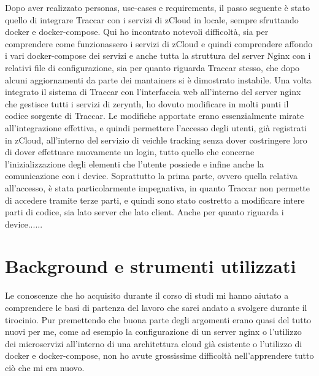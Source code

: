 \documentclass[a4paper,titlepage,12pt]{book}
\begin{document}
Dopo aver realizzato personas, use-cases e requirements, il passo seguente è stato quello di integrare Traccar con i servizi di zCloud in locale, sempre sfruttando docker e docker-compose. Qui ho incontrato notevoli difficoltà, sia per comprendere come funzionassero i servizi di zCloud e quindi comprendere affondo i vari docker-compose dei servizi e anche tutta la struttura del server Nginx con i relativi file di configurazione, sia per quanto riguarda Traccar stesso, che dopo alcuni aggiornamenti da parte dei mantainers si è dimostrato instabile. Una volta integrato il sistema di Traccar con l'interfaccia web all'interno del server nginx che gestisce tutti i servizi di zerynth, ho dovuto modificare in molti punti il codice sorgente di Traccar. Le modifiche apportate erano essenzialmente mirate all'integrazione effettiva, e quindi permettere l'accesso degli utenti, già registrati in zCloud, all'interno del servizio di veichle tracking senza dover costringere loro di dover effettuare nuovamente un login, tutto quello che concerne l'inizializzazione degli elementi che l'utente possiede e infine anche la comunicazione con i device. Soprattutto la prima parte, ovvero quella relativa all'accesso, è stata particolarmente impegnativa, in quanto Traccar non permette di accedere tramite terze parti, e quindi sono stato costretto a modificare intere parti di codice, sia lato server che lato client. Anche per quanto riguarda i device......


\sffamily
\chapter{
\sffamily
Background e strumenti utilizzati}
Le conoscenze che ho acquisito durante il corso di studi mi hanno aiutato a comprendere le basi di partenza del lavoro che sarei andato a svolgere durante il tirocinio. Pur premettendo che buona parte degli argomenti erano quasi del tutto nuovi per me, come ad esempio la configurazione di un server nginx o l'utilizzo dei microservizi all'interno di una architettura cloud già esistente o l'utilizzo di docker e docker-compose, non ho avute grossissime difficoltà nell'apprendere tutto ciò che mi era nuovo.
\end{document}
